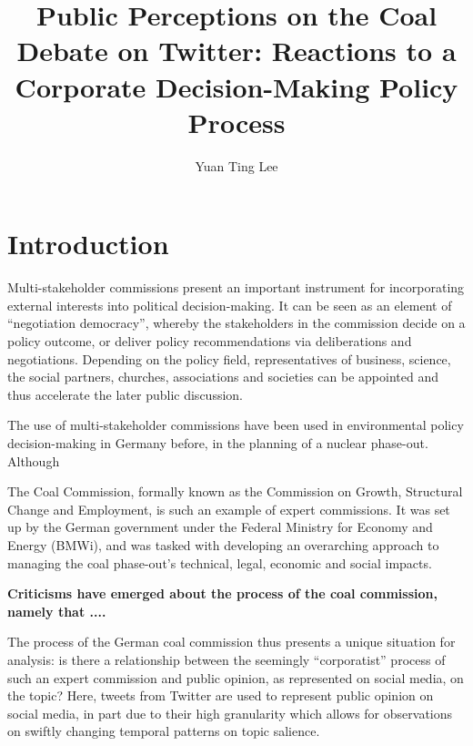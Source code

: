 \documentclass[10pt,twocolumn,twoside,lineno]{pnas-new}
\title{Public Perceptions on the Coal Debate on Twitter: Reactions to a Corporate Decision-Making Policy Process}
\author[a,b]{Yuan Ting Lee}
\affil[a]{Hertie School, Friedrichstr. 180, Berlin 10117, Germany}
\affil[b]{Mercator Research Institute on Global Commons and Climate Change, Torgauer Str. 12 - 15, Berlin 10829, Germany}
\begin{document}
\maketitle
\thispagestyle{firststyle}

\section*{Introduction} \label{sec:introduction}
Multi-stakeholder commissions present an important instrument for incorporating external interests into political decision-making. It can be seen as an element of ``negotiation democracy'', whereby the stakeholders in the commission decide on a policy outcome, or deliver policy recommendations via deliberations and negotiations. Depending on the policy field, representatives of business, science, the social partners, churches, associations and societies can be appointed and thus accelerate the later public discussion. \cite{Siefken2016}

The use of multi-stakeholder commissions have been used in environmental policy decision-making in Germany before, in the planning of a nuclear phase-out. Although 

The Coal Commission, formally known as the Commission on Growth, Structural Change and Employment, is such an example of expert commissions. It was set up by the German government under the Federal Ministry for Economy and Energy (BMWi), and was tasked with developing an overarching approach to managing the coal phase-out’s technical, legal, economic and social impacts.

\textbf{Criticisms have emerged about the process of the coal commission, namely that ....}



The process of the German coal commission thus presents a unique situation for analysis: is there a relationship between the seemingly ``corporatist” process of such an expert commission and public opinion, as represented on social media, on the topic? Here, tweets from Twitter are used to represent public opinion on social media, in part due to their high granularity which allows for observations on swiftly changing temporal patterns on topic salience.
\end{document}
